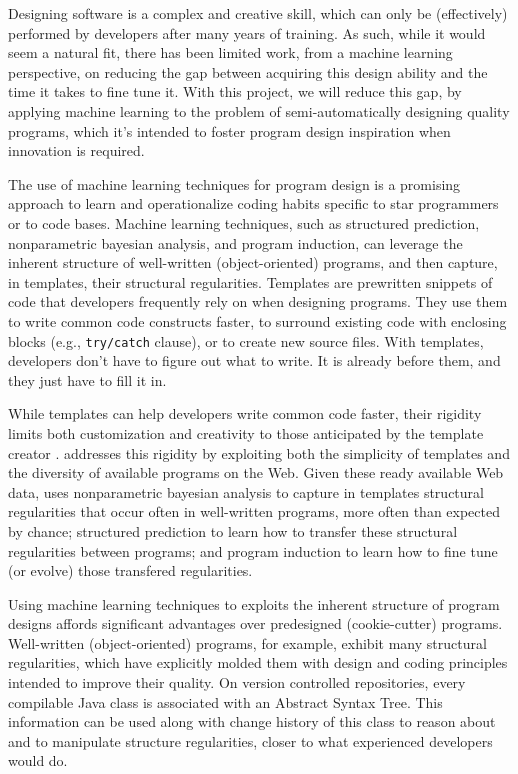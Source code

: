 Designing software is a complex and creative skill, which can only be
(effectively) performed by developers after many years of training. As such,
while it would seem a natural fit, there has been limited work, from a machine
learning perspective, on reducing the gap between acquiring this design ability
and the time it takes to fine tune it. With this project, we will reduce this
gap, by applying machine learning to the problem of semi-automatically designing
quality programs, which it's intended to foster program design inspiration when
innovation is required.

The use of machine learning techniques for program design is a promising
approach to learn and operationalize coding habits specific to star programmers
or to code bases. Machine learning techniques, such as structured prediction,
nonparametric bayesian analysis, and program induction, can leverage the
inherent structure of well-written (object-oriented) programs, and then capture,
in templates, their structural regularities. Templates are prewritten snippets
of code that developers frequently rely on when designing programs. They use
them to write common code constructs faster, to surround existing code with
enclosing blocks (e.g., \texttt{try/catch} clause), or to create new source
files. With templates, developers don't have to figure out what to write. It is
already before them, and they just have to fill it in.

While templates can help developers write common code faster, their rigidity
limits both customization and creativity to those anticipated by the template
creator \cite{Kumar2011-hy}. \pdm addresses this rigidity by exploiting both the
simplicity of templates and the diversity of available programs on the Web.
Given these ready available Web data, \pdm uses nonparametric bayesian analysis
\cite{allamanis2014mining} to capture in templates structural regularities that
occur often in well-written programs, more often than expected by chance;
structured prediction \cite{collins2002discriminative} to learn how to transfer
these structural regularities between programs; and program induction
\cite{lake2015human} to learn how to fine tune (or evolve) those transfered
regularities.

Using machine learning techniques to exploits the inherent structure of program
designs affords significant advantages over predesigned (cookie-cutter)
programs. Well-written (object-oriented) programs, for example, exhibit many
structural regularities, which have explicitly molded them with design and coding
principles intended to improve their quality. On version controlled
repositories, every compilable Java class is associated with an Abstract Syntax
Tree. This information can be used along with change history of this class to
reason about and to manipulate structure regularities, closer to what
experienced developers would do.

